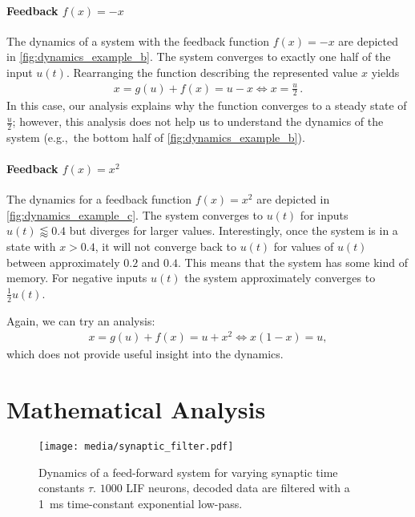 \documentclass[10pt,letterpaper,oneside]{article}
\begin{document}

\paragraph{Feedback $f(x) = -x$}
The dynamics of a system with the feedback function $f(x) = -x$ are depicted in \cref{fig:dynamics_example_b}. The system converges to exactly one half of the input $u(t)$. Rearranging the function describing the represented value $x$ yields
\begin{align*}
	x = g(u) + f(x) = u - x \Leftrightarrow x = \frac{u}2 \,.
\end{align*}
In this case, our analysis explains why the function converges to a steady state of $\frac{u}2$; however, this analysis does not help us to understand the dynamics of the system (e.g.,~the bottom half of \cref{fig:dynamics_example_b}).

\paragraph{Feedback $f(x) = x^2$}
The dynamics for a feedback function $f(x) = x^2$ are depicted in \cref{fig:dynamics_example_c}. The system converges to $u(t)$ for inputs $u(t) \lessapprox 0.4$ but diverges for larger values. Interestingly, once the system is in a state with $x > 0.4$, it will not converge back to $u(t)$ for values of $u(t)$ between approximately $0.2$ and $0.4$. This means that the system has some kind of memory. For negative inputs $u(t)$ the system approximately converges to $\frac{1}2 u(t)$.

Again, we can try an analysis:
\begin{align*}
  x = g(u) + f(x) = u + x^2 \Leftrightarrow x(1-x) = u,
\end{align*}
which does not provide useful insight into the dynamics.

\section*{Mathematical Analysis}

\begin{figure}
	\centering
	\texttt{[image: media/synaptic\_filter.pdf]}\\[-0.5cm]
	\caption{Dynamics of a feed-forward system for varying synaptic time constants $\tau$. $1000$ LIF neurons, decoded data are filtered with a \SI{1}{\milli\second} time-constant exponential low-pass. }
	\label{fig:synaptic_filter}
\end{figure}
\end{document}
